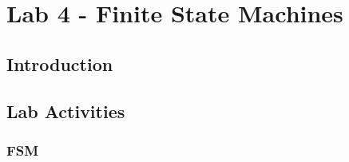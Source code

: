 \section{Lab 4 - Finite State Machines}

\subsection{Introduction}

\subsection{Lab Activities}

\subsubsection{FSM}


\subsubsection{}


